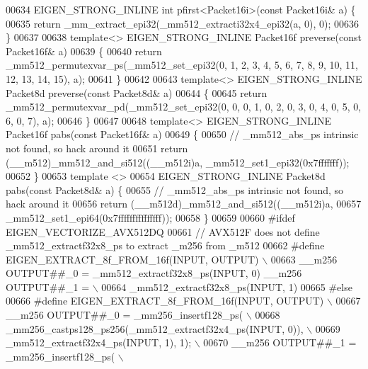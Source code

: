 \begin{DoxyCode}
00634 EIGEN\_STRONG\_INLINE \textcolor{keywordtype}{int} pfirst<Packet16i>(\textcolor{keyword}{const} Packet16i& a) \{
00635   \textcolor{keywordflow}{return} \_mm\_extract\_epi32(\_mm512\_extracti32x4\_epi32(a, 0), 0);
00636 \}
00637 
00638 \textcolor{keyword}{template}<> EIGEN\_STRONG\_INLINE Packet16f preverse(\textcolor{keyword}{const} Packet16f& a)
00639 \{
00640   \textcolor{keywordflow}{return} \_mm512\_permutexvar\_ps(\_mm512\_set\_epi32(0, 1, 2, 3, 4, 5, 6, 7, 8, 9, 10, 11, 12, 13, 14, 15), a);
00641 \}
00642 
00643 \textcolor{keyword}{template}<> EIGEN\_STRONG\_INLINE Packet8d preverse(\textcolor{keyword}{const} Packet8d& a)
00644 \{
00645   \textcolor{keywordflow}{return} \_mm512\_permutexvar\_pd(\_mm512\_set\_epi32(0, 0, 0, 1, 0, 2, 0, 3, 0, 4, 0, 5, 0, 6, 0, 7), a);
00646 \}
00647 
00648 \textcolor{keyword}{template}<> EIGEN\_STRONG\_INLINE Packet16f pabs(\textcolor{keyword}{const} Packet16f& a)
00649 \{
00650   \textcolor{comment}{// \_mm512\_abs\_ps intrinsic not found, so hack around it}
00651   \textcolor{keywordflow}{return} (\_\_m512)\_mm512\_and\_si512((\_\_m512i)a, \_mm512\_set1\_epi32(0x7fffffff));
00652 \}
00653 \textcolor{keyword}{template} <>
00654 EIGEN\_STRONG\_INLINE Packet8d pabs(\textcolor{keyword}{const} Packet8d& a) \{
00655   \textcolor{comment}{// \_mm512\_abs\_ps intrinsic not found, so hack around it}
00656   \textcolor{keywordflow}{return} (\_\_m512d)\_mm512\_and\_si512((\_\_m512i)a,
00657                                    \_mm512\_set1\_epi64(0x7fffffffffffffff));
00658 \}
00659 
00660 \textcolor{preprocessor}{#ifdef EIGEN\_VECTORIZE\_AVX512DQ}
00661 \textcolor{comment}{// AVX512F does not define \_mm512\_extractf32x8\_ps to extract \_m256 from \_m512}
00662 \textcolor{preprocessor}{#define EIGEN\_EXTRACT\_8f\_FROM\_16f(INPUT, OUTPUT)                           \(\backslash\)}
00663 \textcolor{preprocessor}{  \_\_m256 OUTPUT##\_0 = \_mm512\_extractf32x8\_ps(INPUT, 0) \_\_m256 OUTPUT##\_1 = \(\backslash\)}
00664 \textcolor{preprocessor}{      \_mm512\_extractf32x8\_ps(INPUT, 1)}
00665 \textcolor{preprocessor}{#else}
00666 \textcolor{preprocessor}{#define EIGEN\_EXTRACT\_8f\_FROM\_16f(INPUT, OUTPUT)                \(\backslash\)}
00667 \textcolor{preprocessor}{  \_\_m256 OUTPUT##\_0 = \_mm256\_insertf128\_ps(                     \(\backslash\)}
00668 \textcolor{preprocessor}{      \_mm256\_castps128\_ps256(\_mm512\_extractf32x4\_ps(INPUT, 0)), \(\backslash\)}
00669 \textcolor{preprocessor}{      \_mm512\_extractf32x4\_ps(INPUT, 1), 1);                     \(\backslash\)}
00670 \textcolor{preprocessor}{  \_\_m256 OUTPUT##\_1 = \_mm256\_insertf128\_ps(                     \(\backslash\)}

\end{DoxyCode}
